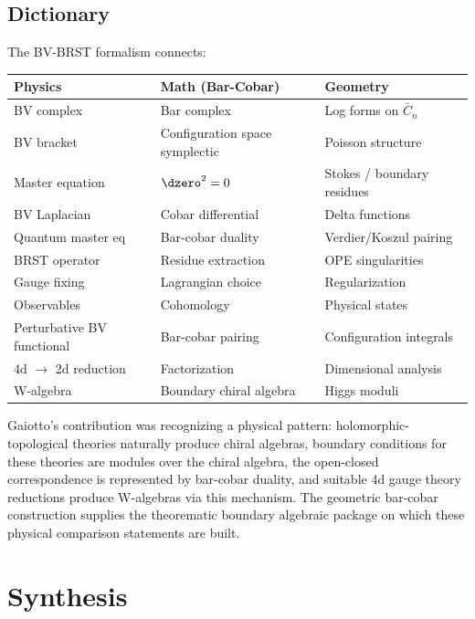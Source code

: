 \subsection{Dictionary}

\begin{remark}[Dictionary]
The BV-BRST formalism connects:

\begin{center}
\begin{tabular}{|l|l|l|}
\hline
\textbf{Physics} & \textbf{Math (Bar-Cobar)} & \textbf{Geometry} \\
\hline
BV complex & Bar complex & Log forms on $\overline{C}_n$ \\
BV bracket & Configuration space symplectic & Poisson structure \\
Master equation & $\dzero^2 = 0$ & Stokes / boundary residues \\
BV Laplacian & Cobar differential & Delta functions \\
Quantum master eq & Bar-cobar duality & Verdier/Koszul pairing \\
BRST operator & Residue extraction & OPE singularities \\
Gauge fixing & Lagrangian choice & Regularization \\
Observables & Cohomology & Physical states \\
Perturbative BV functional & Bar-cobar pairing & Configuration integrals \\
4d $\to$ 2d reduction & Factorization & Dimensional analysis \\
W-algebra & Boundary chiral algebra & Higgs moduli \\
\hline
\end{tabular}
\end{center}
\end{remark}

\begin{remark}
Gaiotto's contribution was recognizing a physical pattern: holomorphic-topological theories naturally produce chiral algebras, boundary conditions for these theories are modules over the chiral algebra, the open-closed correspondence is represented by bar-cobar duality, and suitable 4d gauge theory reductions produce W-algebras via this mechanism. The geometric bar-cobar construction supplies the theorematic boundary algebraic package on which these physical comparison statements are built.
\end{remark}

\section{Synthesis}
\label{sec:htpo-supplement}

